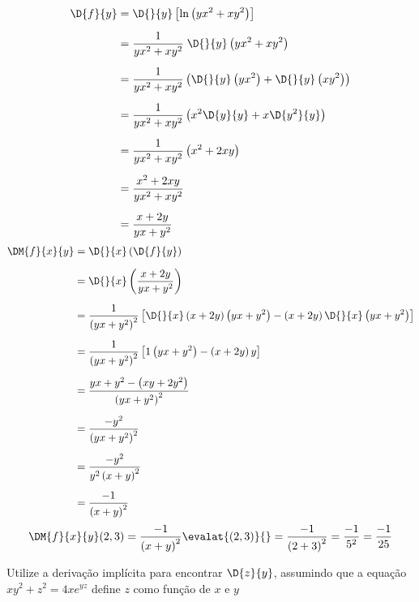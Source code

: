 \documentclass[a4paper,12pt,fleqn]{article}
\begin{document}
\begin{answer}
\begin{align*}
  \D{f}{y}
  & = \D{}{y} \left[\ln\left(yx^2 + xy^2\right)\right]\\[2mm]
  & = \frac{1}{yx^2 + xy^2} \;\D{}{y} \left(yx^2 + xy^2\right)\\[2mm]
  & = \frac{1}{yx^2 + xy^2} \left(\D{}{y}\left(yx^2\right) + \D{}{y}\left(xy^2\right)\right)\\[2mm]
  & = \frac{1}{yx^2 + xy^2} \left(x^2\D{y}{y} + x\D{y^2}{y}\right)\\[2mm]
  & = \frac{1}{yx^2 + xy^2} \left(x^2 + 2xy\right)\\[2mm]
  & = \frac{x^2 + 2xy}{yx^2 + xy^2} \\[2mm]
  & = \frac{x + 2y}{yx + y^2}
\end{align*}
\begin{align*}
  \DM{f}{x}{y}
  & = \D{}{x}\left(\D{f}{y}\right) \\[2mm]
  & = \D{}{x}\left(\frac{x + 2y}{yx + y^2}\right) \\[2mm]
  & = \frac{1}{\left(yx + y^2\right)^2} \left[
    \D{}{x}\left(x + 2y\right)
    \left(yx + y^2\right)
    -
    \left(x + 2y\right)
    \D{}{x}\left(yx + y^2\right)
    \right] \\[2mm]
  & = \frac{1}{\left(yx + y^2\right)^2} \left[
    1 \left(yx + y^2\right)
    - \left(x + 2y\right) y
    \right] \\[2mm]
  & = \frac{yx + y^2 - \left(xy + 2y^2\right)}{\left(yx + y^2\right)^2} \\[2mm]
  & = \frac{-y^2}{\left(yx + y^2\right)^2} \\[2mm]
  & = \frac{-y^2}{y^2\left(x + y\right)^2} \\[2mm]
  & = \frac{-1}{\left(x + y\right)^2}
\end{align*}
\[
  \DM{f}{x}{y}(2, 3)
  = \frac{-1}{\left(x + y\right)^2} \evalat{(2, 3)}{}
  = \frac{-1}{\left(2 + 3\right)^2}
  = \frac{-1}{5^2}
  = \frac{-1}{25}
\]
\end{answer}

Utilize a derivação implícita para encontrar \(\D{z}{y}\), assumindo que a equação
\mbox{$
  xy^2 + z^2 = 4xe^{yz}
$}
define $z$ como função de $x$ e $y$
\end{document}
